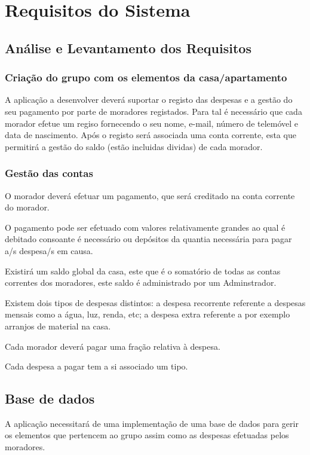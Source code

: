 \chapter{Requisitos do Sistema}

\section{Análise e Levantamento dos Requisitos}
\subsection{Criação do grupo com os elementos da casa/apartamento}
A aplicação a desenvolver deverá suportar o registo das despesas e a gestão do seu pagamento por parte de moradores registados. Para tal é necessário que cada morador efetue um regiso fornecendo o seu nome, e-mail, número de telemóvel e data de nascimento. Após o registo será associada uma conta corrente, esta que permitirá a gestão do saldo (estão incluidas dividas) de cada morador. 


\subsection{Gestão das contas}
 O morador deverá efetuar um pagamento, que será creditado na conta corrente do morador. 
 
 O pagamento pode ser efetuado com valores relativamente grandes ao qual é debitado consoante é necessário ou depósitos da quantia necessária para pagar a/s despesa/s em causa. 
 
 Existirá um saldo global da casa, este que é o somatório de todas as contas correntes dos moradores, este saldo é administrado por um Adminstrador. 
 
 Existem dois tipos de despesas distintos: a despesa recorrente referente a despesas mensais como a água, luz, renda, etc; 
 a despesa extra referente a por exemplo arranjos de material na casa. 
 
 Cada morador deverá pagar uma fração relativa à despesa. 
 
 Cada despesa a pagar tem a si associado um tipo. 
 
 

\section{Base de dados }
A aplicação necessitará de uma implementação de uma base de dados para gerir os elementos que pertencem ao grupo assim como as despesas efetuadas pelos moradores. 

